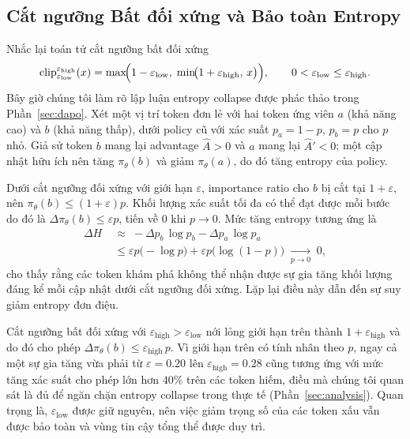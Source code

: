 \documentclass[11pt,a4paper]{article}
\begin{document}
\subsection{Cắt ngưỡng Bất đối xứng và Bảo toàn Entropy}\label{sec:asym_clip}

Nhắc lại toán tử cắt ngưỡng bất đối xứng
\begin{equation}
  \operatorname{clip}_{\varepsilon_{\text{low}}}^{\varepsilon_{\text{high}}}(x) =
  \max\!\Bigl(1-\varepsilon_{\text{low}},\;\min\!\bigl(1+\varepsilon_{\text{high}},\,x\bigr)\Bigr),
  \qquad 0<\varepsilon_{\text{low}}\le\varepsilon_{\text{high}}.
\label{eq:asym_clip}
\end{equation}
Bây giờ chúng tôi làm rõ lập luận entropy collapse được phác thảo trong
Phần~\ref{sec:dapo}. Xét một vị trí token đơn lẻ với hai token ứng viên
\(a\) (khả năng cao) và \(b\) (khả năng thấp), dưới policy cũ với xác suất
\(p_a=1-p\), \(p_b=p\) cho \(p\) nhỏ. Giả sử token \(b\) mang lại advantage
\(\hat{A}>0\) và \(a\) mang lại \(\hat{A}'<0\); một cập nhật hữu ích nên tăng
\(\pi_\theta(b)\) và giảm \(\pi_\theta(a)\), do đó tăng entropy của policy.

Dưới cắt ngưỡng đối xứng với giới hạn \(\varepsilon\), importance ratio cho \(b\) bị
cắt tại \(1+\varepsilon\), nên
\(\pi_\theta(b)\le(1+\varepsilon)p\). Khối lượng xác suất tối đa có thể đạt được mỗi bước
do đó là \(\Delta\pi_\theta(b)\le \varepsilon p\), tiến về 0 khi
\(p\to0\). Mức tăng entropy tương ứng là
\begin{align}
  \Delta H \;&\approx\; -\Delta p_b\,\log p_b - \Delta p_a\,\log p_a \nonumber \\
            &\le \varepsilon p\bigl(-\log p\bigr) + \varepsilon p\bigl(\log(1-p)\bigr)
            \;\xrightarrow[p\to 0]{}\; 0,
\end{align}
cho thấy rằng các token khám phá không thể nhận được sự gia tăng khối lượng đáng kể mỗi cập nhật dưới
cắt ngưỡng đối xứng. Lặp lại điều này dẫn đến sự suy giảm entropy đơn điệu.

Cắt ngưỡng bất đối xứng với \(\varepsilon_{\text{high}}>\varepsilon_{\text{low}}\) nới lỏng
giới hạn trên thành \(1+\varepsilon_{\text{high}}\) và do đó cho phép
\(\Delta\pi_\theta(b)\le\varepsilon_{\text{high}}\,p\). Vì giới hạn trên có tính
nhân theo \(p\), ngay cả một sự gia tăng vừa phải từ
\(\varepsilon=0.20\) lên \(\varepsilon_{\text{high}}=0.28\) cũng tương ứng với mức tăng
xác suất cho phép lớn hơn \(40\%\) trên các token hiếm, điều mà chúng tôi quan sát là đủ để
ngăn chặn entropy collapse trong thực tế (Phần~\ref{sec:analysis}). Quan trọng là,
\(\varepsilon_{\text{low}}\) được giữ nguyên, nên việc giảm trọng số của các token xấu
vẫn được bảo toàn và vùng tin cậy tổng thể được duy trì.
\end{document}
